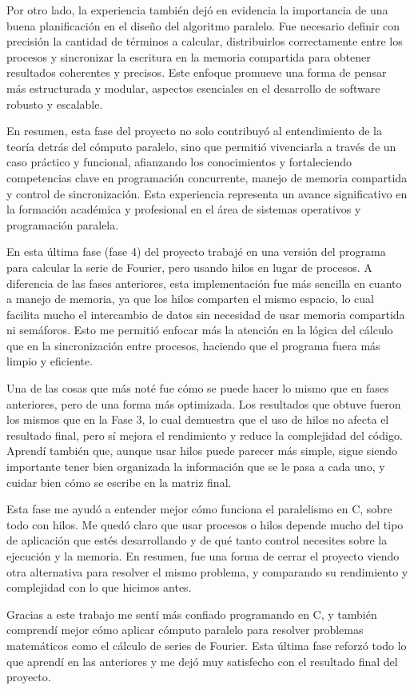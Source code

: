{Por otro lado, la experiencia también dejó en evidencia la importancia de una buena planificación en el diseño del algoritmo paralelo. Fue necesario definir con precisión la cantidad de términos a calcular, distribuirlos correctamente entre los procesos y sincronizar la escritura en la memoria compartida para obtener resultados coherentes y precisos. Este enfoque promueve una forma de pensar más estructurada y modular, aspectos esenciales en el desarrollo de software robusto y escalable.

En resumen, esta fase del proyecto no solo contribuyó al entendimiento de la teoría detrás del cómputo paralelo, sino que permitió vivenciarla a través de un caso práctico y funcional, afianzando los conocimientos y fortaleciendo competencias clave en programación concurrente, manejo de memoria compartida y control de sincronización. Esta experiencia representa un avance significativo en la formación académica y profesional en el área de sistemas operativos y programación paralela.

\newpage

En esta última fase (fase 4) del proyecto trabajé en una versión del programa para calcular la serie de Fourier, pero usando hilos en lugar de procesos. A diferencia de las fases anteriores, esta implementación fue más sencilla en cuanto a manejo de memoria, ya que los hilos comparten el mismo espacio, lo cual facilita mucho el intercambio de datos sin necesidad de usar memoria compartida ni semáforos. Esto me permitió enfocar más la atención en la lógica del cálculo que en la sincronización entre procesos, haciendo que el programa fuera más limpio y eficiente.

Una de las cosas que más noté fue cómo se puede hacer lo mismo que en fases anteriores, pero de una forma más optimizada. Los resultados que obtuve fueron los mismos que en la Fase 3, lo cual demuestra que el uso de hilos no afecta el resultado final, pero sí mejora el rendimiento y reduce la complejidad del código. Aprendí también que, aunque usar hilos puede parecer más simple, sigue siendo importante tener bien organizada la información que se le pasa a cada uno, y cuidar bien cómo se escribe en la matriz final.

Esta fase me ayudó a entender mejor cómo funciona el paralelismo en C, sobre todo con hilos. Me quedó claro que usar procesos o hilos depende mucho del tipo de aplicación que estés desarrollando y de qué tanto control necesites sobre la ejecución y la memoria. En resumen, fue una forma de cerrar el proyecto viendo otra alternativa para resolver el mismo problema, y comparando su rendimiento y complejidad con lo que hicimos antes.

Gracias a este trabajo me sentí más confiado programando en C, y también comprendí mejor cómo aplicar cómputo paralelo para resolver problemas matemáticos como el cálculo de series de Fourier. Esta última fase reforzó todo lo que aprendí en las anteriores y me dejó muy satisfecho con el resultado final del proyecto.

}